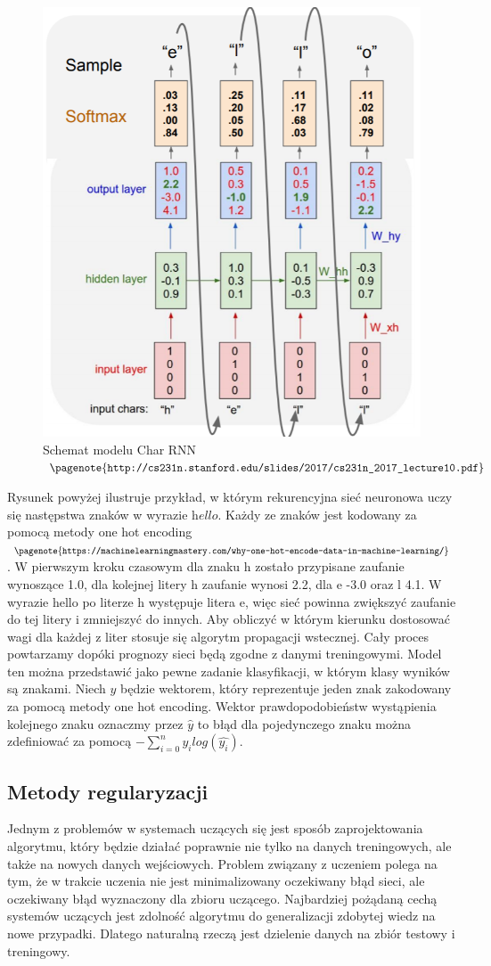 	\begin{figure}[H]
		\centering
		\includegraphics[width=0.5\linewidth]{char_rnn}
		\caption{Schemat modelu Char RNN $\pagenote{\texttt{http://cs231n.stanford.edu/slides/2017/cs231n\_2017\_lecture10.pdf}}$}
		\label{fig:charrnn}
	\end{figure}
	
	Rysunek powyżej ilustruje przykład, w którym rekurencyjna sieć neuronowa uczy się następstwa znaków w wyrazie $\textit{hello}$. Każdy ze znaków jest kodowany za pomocą metody one hot encoding$\pagenote{\texttt{https://machinelearningmastery.com/why-one-hot-encode-data-in-machine-learning/}}$. W pierwszym kroku czasowym dla znaku h zostało przypisane zaufanie wynoszące 1.0, dla kolejnej litery h zaufanie wynosi 2.2, dla e -3.0 oraz l 4.1. W wyrazie hello po literze h występuje litera e, więc sieć powinna zwiększyć zaufanie do tej litery i zmniejszyć do innych. Aby obliczyć w którym kierunku dostosować wagi dla każdej z liter stosuje się algorytm propagacji wstecznej. Cały proces powtarzamy dopóki prognozy sieci będą zgodne z danymi treningowymi. Model ten można przedstawić jako pewne zadanie klasyfikacji, w którym klasy wyników są znakami. Niech $y$ będzie wektorem, który reprezentuje jeden znak zakodowany za pomocą metody one hot encoding. Wektor prawdopodobieństw wystąpienia kolejnego znaku oznaczmy przez $\hat{y}$ to błąd dla pojedynczego znaku można zdefiniować za pomocą $- \sum_{i=0}^{n} y_{i} log(\hat{y_{i}})$.



	\subsection{Metody regularyzacji}	

	Jednym z problemów w systemach uczących się jest sposób zaprojektowania algorytmu, który będzie działać poprawnie nie tylko na danych treningowych, ale także na nowych danych wejściowych. Problem związany z uczeniem polega na tym, że w trakcie uczenia nie jest minimalizowany oczekiwany błąd sieci, ale oczekiwany błąd wyznaczony dla zbioru uczącego. Najbardziej pożądaną cechą systemów uczących jest zdolność algorytmu do generalizacji zdobytej wiedz na nowe przypadki. Dlatego naturalną rzeczą jest dzielenie danych na zbiór testowy i treningowy. 

